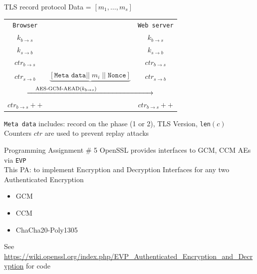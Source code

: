 \documentclass[usenames,dvipsnames, 9pt]{beamer}
\begin{document}
\begin{frame}{TLS record protocol}
\Large Data = $\left[m_1, \ldots, m_s\right]$
\LARGE
\begin{center}
	\begin{tabular}{c c c }
\texttt{Browser}&   & \texttt{Web server}  \\
$k_{b\rightarrow s}$&  & $k_{b\rightarrow s}$\\ 
$k_{s\rightarrow b}$&  & $k_{s\rightarrow b}$  \\ 
$ctr_{b\rightarrow s}$&  & $ctr_{b\rightarrow s}$\\ 
$ctr_{s\rightarrow b}$& {\large$\underbrace{
		\left[
		\texttt{Meta data} || \;
		m_i \; || \;
		\texttt{Nonce}
		\right]}$}  & $ctr_{s\rightarrow b}$  \\ 
\multicolumn{3}{c}{ $\xrightarrow{ \hspace{1em}  \Huge \text{AES-GCM-AEAD}(k_{b\rightarrow s}) \hspace{3.4em} }$  }  \pause \\
$ctr_{b\rightarrow s}++$&  & $ctr_{b\rightarrow s}++$\\ 
\end{tabular}
\end{center}

\pause 
\vspace{10pt}
\texttt{Meta data} includes: record on the phase (1 or 2), TLS Version, \texttt{len}$(c)$ \\
Counters $ctr$ are used to prevent replay attacks

\end{frame}

\begin{frame}{Programming Assignment \# 5}
\Large
OpenSSL provides interfaces to GCM, CCM AEs via \texttt{EVP}\\[15pt]


This PA:  to implement Encryption and Decryption Interfaces for any two Authenticated Encryption
\begin{itemize}
	\item GCM 
	\item CCM 
	\item ChaCha20-Poly1305
\end{itemize}

\vspace{10pt}
See \url{https://wiki.openssl.org/index.php/EVP_Authenticated_Encryption_and_Decryption} for code


\end{frame}
\end{document}
